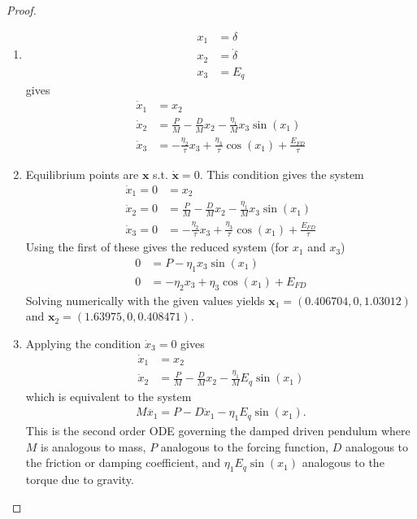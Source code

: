 \documentclass[12pt]{exam}
\renewenvironment{solution}%
{%
    \renewcommand{\proofname}{Solution}%
    \begin{proof}%
}{\end{proof}}
\theoremstyle{mytheoremstyle}
\begin{document}
\begin{solution} \
\begin{enumerate}[label=(P\arabic*)]
    \item 
    \begin{align*}
        x_1 &= \delta \\   
        x_2 &= \dot{\delta} \\
        x_3 &= E_q
    \end{align*}
    gives 
    \begin{align*}
        \dot{x}_1 &= x_2 \\
        \dot{x}_2 &= \frac{P}{M} - \frac{D}{M} x_2 - \frac{\eta_1}{M} x_3 \sin(x_1) \\
        \dot{x}_3 &= - \frac{\eta_2}{\tau} x_3 + \frac{\eta_3}{\tau} \cos(x_1) + \frac{E_{FD}}{\tau}  
    \end{align*}
    \item Equilibrium points are $\textbf{x}$ s.t. $\dot{\textbf{x}} = 0$. This condition gives the system 
    \begin{align*}
        \dot{x}_1 = 0 &= x_2 \\
        \dot{x}_2 = 0 &= \frac{P}{M} - \frac{D}{M} x_2 - \frac{\eta_1}{M} x_3 \sin(x_1) \\
        \dot{x}_3 = 0 &= - \frac{\eta_2}{\tau} x_3 + \frac{\eta_3}{\tau} \cos(x_1) + \frac{E_{FD}}{\tau} 
    \end{align*}
    Using the first of these gives the reduced system (for $x_1$ and $x_3$)
    \begin{align*}
        0 &= P - \eta_1 x_3 \sin(x_1) \\
        0 &= - \eta_2 x_3 + \eta_3 \cos(x_1) + E_{FD} 
    \end{align*}
    Solving numerically with the given values yields $\textbf{x}_1 = (0.406704, 0, 1.03012)$ and $\textbf{x}_2 = (1.63975, 0, 0.408471)$. 
    \item Applying the condition $\dot{x}_3 = 0$ gives 
    \begin{align*}
        \dot{x}_1 &= x_2\\
        \dot{x}_2 &= \frac{P}{M} - \frac{D}{M} x_2 - \frac{\eta_1}{M} E_q \sin(x_1)
    \end{align*}
    which is equivalent to the system 
    \begin{align*}
        M \ddot{x_1} = P - D \dot{x}_1 - \eta_1 E_q \sin(x_1).
    \end{align*}
    This is the second order ODE governing the damped driven pendulum where $M$ is analogous to mass, $P$ analogous to the forcing function, $D$ analogous to the friction or damping coefficient, and $\eta_1 E_q \sin(x_1)$ analogous to the torque due to gravity.  
\end{enumerate}

\end{solution}
\end{document}
